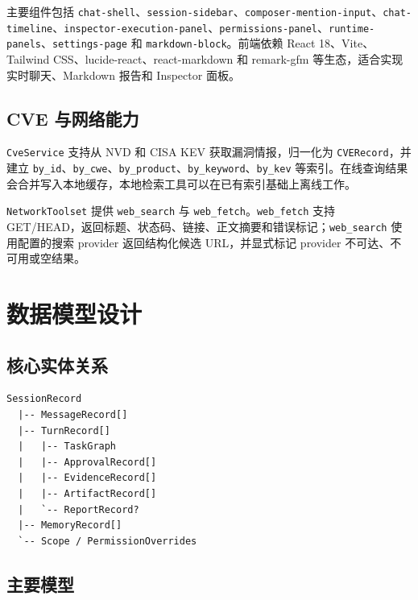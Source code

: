 \documentclass[UTF8,zihao=-4,a4paper,fontset=none]{ctexart}
\newcommand{\code}[1]{\texttt{\footnotesize #1}}
\begin{document}
主要组件包括 \code{chat-shell}、\code{session-sidebar}、\code{composer-mention-input}、\code{chat-timeline}、\code{inspector-execution-panel}、\code{permissions-panel}、\code{runtime-panels}、\code{settings-page} 和 \code{markdown-block}。前端依赖 React 18、Vite、Tailwind CSS、lucide-react、react-markdown 和 remark-gfm 等生态，适合实现实时聊天、Markdown 报告和 Inspector 面板。

\subsection{CVE 与网络能力}

\code{CveService} 支持从 NVD 和 CISA KEV 获取漏洞情报，归一化为 \code{CVERecord}，并建立 \code{by\_id}、\code{by\_cwe}、\code{by\_product}、\code{by\_keyword}、\code{by\_kev} 等索引。在线查询结果会合并写入本地缓存，本地检索工具可以在已有索引基础上离线工作。

\code{NetworkToolset} 提供 \code{web\_search} 与 \code{web\_fetch}。\code{web\_fetch} 支持 GET/HEAD，返回标题、状态码、链接、正文摘要和错误标记；\code{web\_search} 使用配置的搜索 provider 返回结构化候选 URL，并显式标记 provider 不可达、不可用或空结果。

\section{数据模型设计}

\subsection{核心实体关系}

\begin{lstlisting}[caption={核心实体关系（概念模型）}]
SessionRecord
  |-- MessageRecord[]
  |-- TurnRecord[]
  |   |-- TaskGraph
  |   |-- ApprovalRecord[]
  |   |-- EvidenceRecord[]
  |   |-- ArtifactRecord[]
  |   `-- ReportRecord?
  |-- MemoryRecord[]
  `-- Scope / PermissionOverrides
\end{lstlisting}

\subsection{主要模型}
\end{document}
